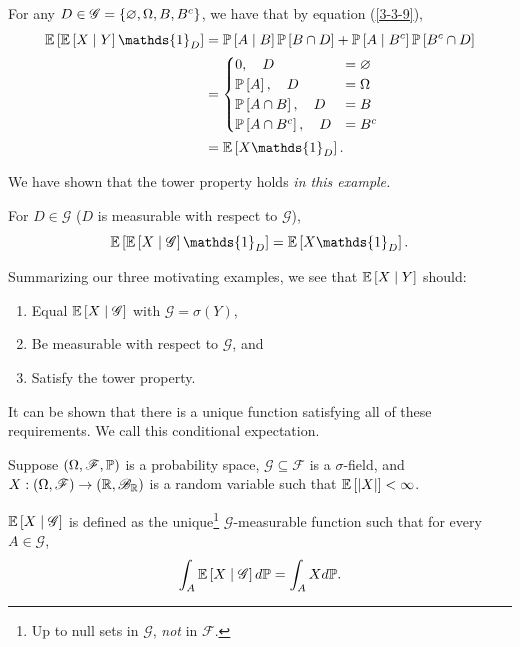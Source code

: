 For any $D \in \mathscr{G} = \left\{\O, \Omega, B, B^{c}\right\}$, we have that by equation (\ref{3-3-9}),
\begin{align*}
	\E\left[\E\left[X \mid Y\right] \mathds{1}_{D}\right] 
	&= \P\left[A \mid B\right] \P\left[B \cap D\right] + \P\left[A \mid B^{c}\right] \P\left[B^{c} \cap D\right]  \\
	&= \begin{cases}
		0, \quad D&= \O\\ \P\left[A\right], \quad D &= \Omega \\
		\P\left[A \cap B\right] , \quad D &= B \\
		\P\left[A \cap B^{c}\right] , \quad D &= B^{c}
	\end{cases} \\
	&= \E\left[X \mathds{1}_{D}\right] 
.\end{align*}

We have shown that the tower property holds \emph{in this example.}

\begin{proposition}
	For $D \in \mathscr{G}$ ($D$ is measurable with respect to $\mathscr{G}$), \[
		\E\left[\E\left[X \mid \mathscr{G}\right] \mathds{1}_{D}\right] = \E\left[X \mathds{1}_{D}\right] 
	.\] 
\end{proposition}

Summarizing our three motivating examples, we see that $\E\left[X \mid Y\right] $ should:
\begin{enumerate}[label = (\roman*)]
	\item Equal $\E\left[X \mid \mathscr{G}\right] $ with $\mathscr{G} = \sigma(Y)$,
	\item Be measurable with respect to $\mathscr{G}$, and
	\item Satisfy the tower property.
\end{enumerate}

It can be shown that there is a unique function satisfying all of these requirements. We call this conditional expectation.

\begin{definition}
	Suppose $\left( \Omega, \mathscr{F}, \P\right)$ is a probability space, $\mathscr{G} \subseteq \mathscr{F}$ is a $\sigma$-field, and $X: \left( \Omega, \mathscr{F} \right)\to \left( \R, \mathscr{B}_\R \right)$ is a random variable such that $\E\left[\left| X \right|\right] < \infty$.

	$\E\left[X \mid \mathscr{G}\right] $ is defined as the unique\footnote{Up to null sets in $\mathscr{G}$, \emph{not} in $\mathscr{F}$.} $\mathscr{G}$-measurable function such that for every $A \in \mathscr{G}$, \[
		\int_A \E\left[X \mid \mathscr{G}\right] d\P = \int_A X d\P
	.\] 
\end{definition}

